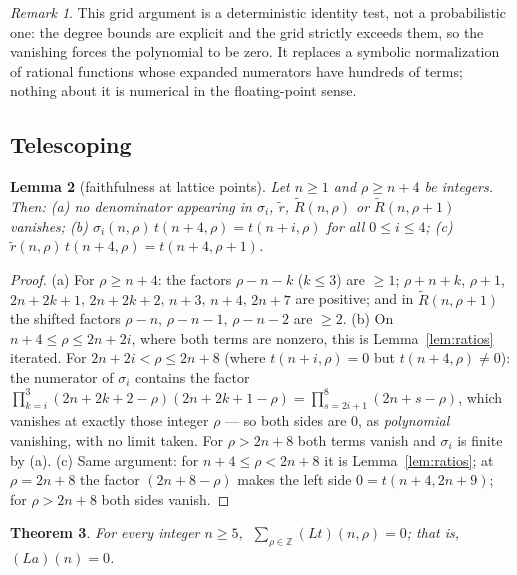\documentclass[11pt]{article}
\theoremstyle{plain}
\newtheorem{theorem}{Theorem}
\newtheorem{lemma}[theorem]{Lemma}
\theoremstyle{definition}
\theoremstyle{remark}
\newtheorem{remark}[theorem]{Remark}
\newcommand{\Lop}{L}
\newcommand{\Rt}{\widetilde{R}}
\newcommand{\ZZ}{\mathbb{Z}}
\begin{document}
\begin{remark}
This grid argument is a deterministic identity test, not a probabilistic one: the degree bounds
are explicit and the grid strictly exceeds them, so the vanishing forces the polynomial to be
zero. It replaces a symbolic normalization of rational functions whose expanded numerators have
hundreds of terms; nothing about it is numerical in the floating-point sense.
\end{remark}

\subsection{Telescoping}

\begin{lemma}[faithfulness at lattice points]\label{lem:faithful}
Let $n\ge1$ and $\rho\ge n+4$ be integers. Then:
(a) no denominator appearing in $\sigma_i$, $\tilde r$, $\Rt(n,\rho)$ or $\Rt(n,\rho{+}1)$
vanishes;
(b) $\sigma_i(n,\rho)\,t(n{+}4,\rho)=t(n{+}i,\rho)$ for all $0\le i\le4$;
(c) $\tilde r(n,\rho)\,t(n{+}4,\rho)=t(n{+}4,\rho{+}1)$.
\end{lemma}

\begin{proof}
(a) For $\rho\ge n+4$: the factors $\rho-n-k$ ($k\le3$) are $\ge1$; $\rho+n+k$, $\rho+1$,
$2n+2k+1$, $2n+2k+2$, $n+3$, $n+4$, $2n+7$ are positive; and in $\Rt(n,\rho{+}1)$ the shifted
factors $\rho-n$, $\rho-n-1$, $\rho-n-2$ are $\ge2$.
(b) On $n+4\le\rho\le 2n+2i$, where both terms are nonzero, this is Lemma~\ref{lem:ratios}
iterated. For $2n+2i<\rho\le2n+8$ (where $t(n{+}i,\rho)=0$ but $t(n{+}4,\rho)\ne0$): the
numerator of $\sigma_i$ contains the factor $\prod_{k=i}^{3}(2n{+}2k{+}2{-}\rho)(2n{+}2k{+}1{-}\rho)
=\prod_{s=2i+1}^{8}(2n{+}s{-}\rho)$, which vanishes at exactly those integer $\rho$ --- so both
sides are $0$, as \emph{polynomial} vanishing, with no limit taken. For $\rho>2n+8$ both terms
vanish and $\sigma_i$ is finite by (a).
(c) Same argument: for $n+4\le\rho<2n+8$ it is Lemma~\ref{lem:ratios}; at $\rho=2n+8$ the factor
$(2n{+}8{-}\rho)$ makes the left side $0=t(n{+}4,2n{+}9)$; for $\rho>2n+8$ both sides vanish.
\end{proof}

\begin{theorem}\label{thm:telescope}
For every integer $n\ge5$, $\;\sum_{\rho\in\ZZ}(\Lop t)(n,\rho)=0$; that is,
$(\Lop a)(n)=0$.
\end{theorem}
\end{document}
